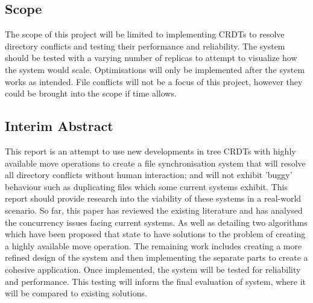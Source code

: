 \documentclass[12pt]{article}
\begin{document}
\subsection{Scope}
The scope of this project will be limited to implementing CRDTs to resolve directory conflicts and
testing their performance and reliability. The system should be tested with a varying number of
replicas to attempt to visualize how the system would scale. Optimisations will only be
implemented after the system works as intended.
File conflicts will not be a focus of this project, however they could be brought into the scope if
time allows.

\subsection{Interim Abstract}
This report is an attempt to use new developments in tree CRDTs with
highly available move operations to create a file synchronisation system that
will resolve all directory conflicts without human interaction; and will not
exhibit ’buggy’ behaviour such as duplicating files which some current systems exhibit. This report should provide research into the viability of these
systems in a real-world scenario. So far, this paper has reviewed the existing
literature and has analysed the concurrency issues facing current systems. As
well as detailing two algorithms which have been proposed that state to have
solutions to the problem of creating a highly available move operation.
The remaining work includes creating a more refined design of the system and
then implementing the separate parts to create a cohesive application. Once
implemented, the system will be tested for reliability and performance. This
testing will inform the final evaluation of system, where it will be compared
to existing solutions.


\end{document}
